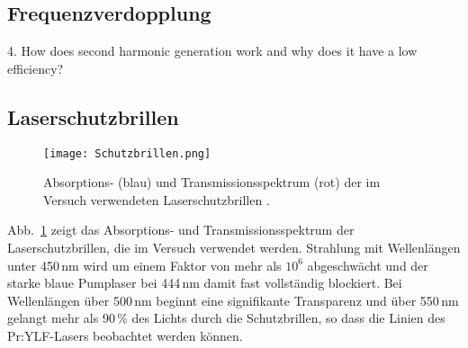 \subsection{Frequenzverdopplung}

4. How does second harmonic generation work and why does it have a low
efficiency?



\subsection{Laserschutzbrillen}

\begin{figure}[H]
\begin{center}
  \texttt{[image: Schutzbrillen.png]}
  \caption{Absorptions- (blau)  und Transmissionsspektrum (rot) der im Versuch
  verwendeten Laserschutzbrillen \cite{Versuchsanleitung}.}
  \label{img:Schutzbrillen}
\end{center}
\end{figure}

Abb.~\ref{img:Schutzbrillen} zeigt das Absorptions- und Transmissionsspektrum der
Laserschutzbrillen, die im Versuch verwendet werden.
Strahlung mit Wellenlängen unter 450\,nm wird um einem Faktor von mehr als $10^6$ abgeschwächt und
der starke blaue Pumplaser bei 444\,nm damit fast vollständig blockiert.
Bei Wellenlängen über 500\,nm beginnt eine signifikante Transparenz und über 550\,nm gelangt mehr
als 90\,\% des Lichts durch die Schutzbrillen,
so dass die Linien des Pr:YLF-Lasers beobachtet werden können.


